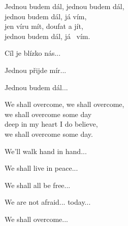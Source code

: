 
\ve{}
Jednou budem dál, jednou budem dál,\\
jednou budem dál, \quad {}já vím, \\
jen víru mít, doufat a \quad {}jít,\\
jednou budem dál, já \ vím. 

\ve{}
Cíl je blízko nás...

\ve{}
Jednou přijde mír...

\ve{}
Jednou budem dál...

\hspace{3em}

\setcounter{enumi}{0}

\ve{}
We shall overcome, we shall overcome,\\
we shall overcome some day\\
deep in my heart I do believe,\\
we shall overcome some day.

\ve{}
We'll walk hand in hand...

\ve{}
We shall live in peace...

\ve{}
We shall all be free...

\ve{}
We are not afraid... today...

\ve{}
We shall overcome...

\esong